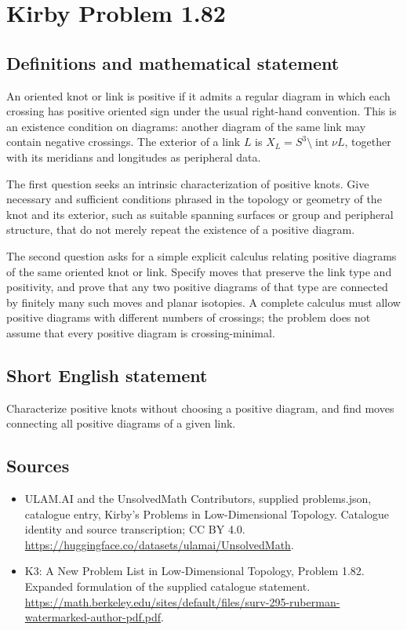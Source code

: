 \documentclass[11pt,a4paper]{article}
\begin{document}
\section*{Kirby Problem 1.82}\label{statement}

\subsection{Definitions and mathematical statement}
An oriented knot or link is positive if it admits a regular diagram in which
each crossing has positive oriented sign under the usual right-hand convention.
This is an existence condition on diagrams: another diagram of the same link
may contain negative crossings. The exterior of a link $L$ is
$X_L=S^3\setminus\operatorname{int}\nu L$, together with its meridians and
longitudes as peripheral data.

The first question seeks an intrinsic characterization of positive knots.
Give necessary and sufficient conditions phrased in the topology or geometry
of the knot and its exterior, such as suitable spanning surfaces or group and
peripheral structure, that do not merely repeat the existence of a positive
diagram.

The second question asks for a simple explicit calculus relating positive
diagrams of the same oriented knot or link. Specify moves that preserve the
link type and positivity, and prove that any two positive diagrams of that
type are connected by finitely many such moves and planar isotopies. A complete
calculus must allow positive diagrams with different numbers of crossings;
the problem does not assume that every positive diagram is crossing-minimal.
\subsection{Short English statement}
Characterize positive knots without choosing a positive diagram, and find moves connecting all positive diagrams of a given link.
\subsection{Sources}
\begin{itemize}
\item[S1] ULAM.AI and the UnsolvedMath Contributors, supplied problems.json, catalogue entry, Kirby's Problems in Low-Dimensional Topology. Catalogue identity and source transcription; CC BY 4.0.
\url{https://huggingface.co/datasets/ulamai/UnsolvedMath}.
\item[S2] K3: A New Problem List in Low-Dimensional Topology, Problem 1.82. Expanded formulation of the supplied catalogue statement.
\url{https://math.berkeley.edu/sites/default/files/surv-295-ruberman-watermarked-author-pdf.pdf}.
\end{itemize}
\end{document}
